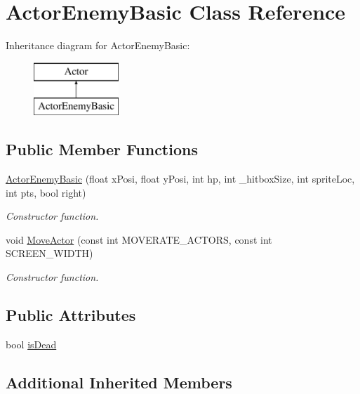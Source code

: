 \hypertarget{class_actor_enemy_basic}{}\section{Actor\+Enemy\+Basic Class Reference}
\label{class_actor_enemy_basic}
Inheritance diagram for Actor\+Enemy\+Basic\+:\begin{figure}[H]
\begin{center}
\leavevmode
\includegraphics[height=2.000000cm]{class_actor_enemy_basic}
\end{center}
\end{figure}
\subsection*{Public Member Functions}
\begin{DoxyCompactItemize}
\item 
\hyperlink{class_actor_enemy_basic_a316b5d681a568f7cee2880b6cb9bf036}{Actor\+Enemy\+Basic} (float x\+Posi, float y\+Posi, int hp, int \+\_\+hitbox\+Size, int sprite\+Loc, int pts, bool right)
\begin{DoxyCompactList}\small\item\em Constructor function. \end{DoxyCompactList}\item 
void \hyperlink{class_actor_enemy_basic_a63b1ac77626c6c4c78cca1a4e87b17af}{Move\+Actor} (const int M\+O\+V\+E\+R\+A\+T\+E\+\_\+\+A\+C\+T\+O\+RS, const int S\+C\+R\+E\+E\+N\+\_\+\+W\+I\+D\+TH)
\begin{DoxyCompactList}\small\item\em Constructor function. \end{DoxyCompactList}\end{DoxyCompactItemize}
\subsection*{Public Attributes}
\begin{DoxyCompactItemize}
\item 
bool \hyperlink{class_actor_enemy_basic_ad3e644b5068939233cf710b9067868bc}{is\+Dead}
\end{DoxyCompactItemize}
\subsection*{Additional Inherited Members}



